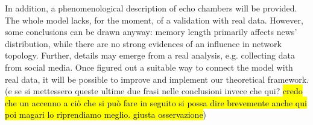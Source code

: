 In addition, a phenomenological description of echo chambers
will be provided.
The whole model lacks, for the moment, of a validation with real data.
However, some conclusions can be drawn anyway: memory length
primarily affects news' distribution, while there are no strong
evidences of an influence in network topology.
Further, details may emerge from a real analysis, e.g. collecting data
from social media. Once figured out a suitable way to connect the model with
real data, it will be possible to improve and implement
our theoretical framework. (e se si mettessero queste ultime due frasi
nelle conclusioni invece che qui? \hl{credo che un accenno a
  ci\`o che si pu\`o fare in seguito si possa dire brevemente anche
qui poi magari lo riprendiamo meglio. giusta osservazione})
